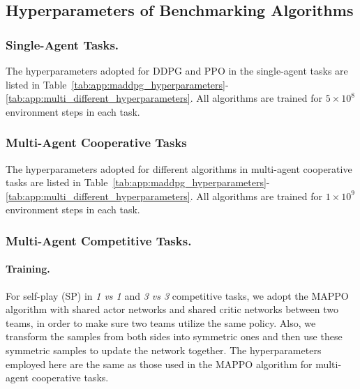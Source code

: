 \begin{table}[t]
    \centering
    
    \label{tab:app:maddpg_hyperparameters}
\end{table}

\subsection{Hyperparameters of Benchmarking Algorithms}

\subsubsection{Single-Agent Tasks.}
The hyperparameters adopted for DDPG and PPO in the single-agent tasks are listed in Table~\ref{tab:app:maddpg_hyperparameters}-\ref{tab:app:multi_different_hyperparameters}. All algorithms are trained for $5\times10^{8}$ environment steps in each task. 

\subsubsection{Multi-Agent Cooperative Tasks}
The hyperparameters adopted for different algorithms in multi-agent cooperative tasks are listed in Table~\ref{tab:app:maddpg_hyperparameters}-\ref{tab:app:multi_different_hyperparameters}. All algorithms are trained for $1\times10^{9}$ environment steps in each task. 

\begin{table}[t]
    \centering
    
    \label{tab:app:multi_hyperparameters}
\end{table}

\begin{table}[t]
    \centering
    
    \label{tab:app:multi_different_hyperparameters}
\end{table}

\subsubsection{Multi-Agent Competitive Tasks.}

\paragraph{Training.}
For self-play (SP) in \textit{1 vs 1} and \textit{3 vs 3} competitive tasks, we adopt the MAPPO algorithm with shared actor networks and shared critic networks between two teams, in order to make sure two teams utilize the same policy. Also, we transform the samples from both sides into symmetric ones and then use these symmetric samples to update the network together. The hyperparameters employed here are the same as those used in the MAPPO algorithm for multi-agent cooperative tasks.

